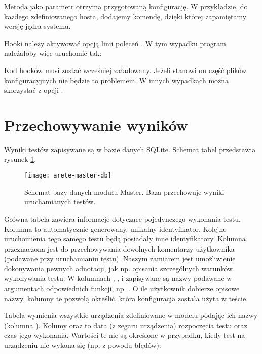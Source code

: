 \documentclass[00-praca-magisterska.tex]{subfiles}
\begin{document}
Metoda  jako parametr otrzyma przygotowaną
konfigurację. W przykładzie, do każdego zdefiniowanego hosta, dodajemy komendę,
dzięki której zapamiętamy wersję jądra systemu.

Hooki należy aktywować opcją linii poleceń . W tym wypadku
program należałoby więc uruchomić tak:

\begin{textcode}
\end{textcode}

Kod hooków musi zostać wcześniej załadowany. Jeżeli stanowi on część plików
konfiguracyjnych nie będzie to problemem. W innych wypadkach można skorzystać z
opcji .

\section{Przechowywanie wyników}

Wyniki testów zapisywane są w bazie danych SQLite. Schemat tabel przedstawia
rysunek \ref{fig:arete-master-db}.

\begin{figure}[htb]
\begin{center}
\leavevmode
\texttt{[image: arete-master-db]}
\end{center}
\caption{Schemat bazy danych modułu Master. Baza przechowuje wyniki
uruchamianych testów.}
\label{fig:arete-master-db}
\end{figure}

Główna tabela  zawiera informacje dotyczące pojedynczego wykonania
testu. Kolumna  to automatycznie generowany, unikalny identyfikator.
Kolejne uruchomienia tego samego testu będą posiadały inne identyfikatory.
Kolumna  przeznaczona jest do przechowywania dowolnych komentarzy
użytkownika (podawane przy uruchamianiu testu). Naszym zamiarem jest
umożliwienie dokonywania pewnych adnotacji, jak np. opisania szczególnych
warunków wykonywania testu. W kolumnach , ,
 i  zapisywane są nazwy podawane w argumentach
odpowiednich funkcji, np. . O ile użytkownik
dobierze opisowe nazwy, kolumny te pozwolą określić, która konfiguracja została
użyta w teście.

Tabela  wymienia wszystkie urządzenia zdefiniowane w modelu podając
ich nazwy (kolumna ). Kolumy  oraz 
to data (z zegaru urządzenia) rozpoczęcia testu oraz czas jego wykonania.
Wartości te nie są określone w przypadku, kiedy test na urządzeniu nie wykona
się (np. z powodu błędów).
\end{document}
